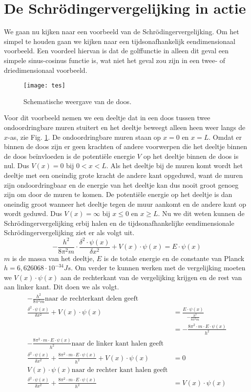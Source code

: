 \documentclass[11pt,fleqn]{book} %
\begin{document}
\section{De Schrödingervergelijking in actie}
We gaan nu kijken naar een voorbeeld van de Schrödingervergelijking. Om het simpel te houden gaan we kijken naar een tijdsonafhankelijk eendimensionaal voorbeeld. Een voordeel hiervan is dat de golffunctie in alleen dit geval een simpele sinus-cosinus functie is, wat niet het geval zou zijn in een twee- of driedimensionaal voorbeeld.
\begin{figure}[h]
	\centering\texttt{[image: tes]}
	\caption{Schematische weergave van de doos.}
	\label{fig:tes}
\end{figure}
Voor dit voorbeeld nemen we een deeltje dat in een doos tussen twee ondoordringbare muren stuitert en het deeltje beweegt alleen heen weer langs de $x$-as, zie Fig. \ref{fig:tes}. De ondoordringbare muren staan op $x = 0$ en $x = L$.  Omdat er binnen de doos zijn er geen krachten of andere voorwerpen die het deeltje binnen de doos beïnvloeden is de potentiële energie $V$ op het deeltje binnen de doos is nul. Dus $V(x)=0$ bij $0 < x < L$. Als het deeltje bij de muren komt wordt het deeltje met een oneindig grote kracht de andere kant opgeduwd, want de muren zijn ondoordringbaar en de energie van het deeltje kan dus nooit groot genoeg zijn om door de muren te komen. De potentiële energie op het deeltje is dan oneindig groot wanneer het deeltje tegen de muur aankomt en de andere kant op wordt geduwd. Dus $V(x)=\infty$ bij $x\leq 0$ en $x\geq L$. Nu we dit weten kunnen de Schrödingervergelijking erbij halen en de tijdsonafhankelijke eendimensionale Schrödingervergelijking ziet er als volgt uit.
\begin{displaymath}
-\frac{h^2}{8\pi^2m}\cdot\frac{\delta^2\cdot \psi(x)}{\delta x^2}+V(x)\cdot \psi(x)=E\cdot\psi(x)
\end{displaymath}
$m$ is de massa van het deeltje, $E$ is de totale energie en de constante van Planck $h=6,626068\cdot10^{-34} Js$. Om verder te kunnen werken met de vergelijking moeten we $V(x)\cdot\psi(x)$ aan de rechterkant van de vergelijking krijgen en de rest van aan linker kant. Dit doen we als volgt.
\begin{align*}
-\frac{h^2}{8\pi^2m}\text{naar de rechterkant delen geeft}\\
\frac{\delta^2\cdot\psi(x)}{\delta x^2}+V(x)\cdot\psi(x) &= \frac{E\cdot\psi(x)}{-\frac{h^2}{8\pi^2m}}\\
&= -\frac{8\pi^2\cdot m\cdot E\cdot\psi(x)}{h^2}\\
-\frac{8\pi^2\cdot m\cdot E\cdot\psi(x)}{h^2}\text{naar de linker kant halen geeft}\\
\frac{\delta^2\cdot\psi(x)}{\delta x^2}+\frac{8\pi^2\cdot m\cdot E\cdot\psi(x)}{h^2}+V(x)\cdot\psi(x) &= 0\\
V(x)\cdot\psi(x)\text{naar de rechter kant halen geeft}\\
\frac{\delta^2\cdot\psi(x)}{\delta x^2}+\frac{8\pi^2\cdot m\cdot E\cdot\psi(x)}{h^2} &= V(x)\cdot\psi(x)\\
\end{align*}
\end{document}
